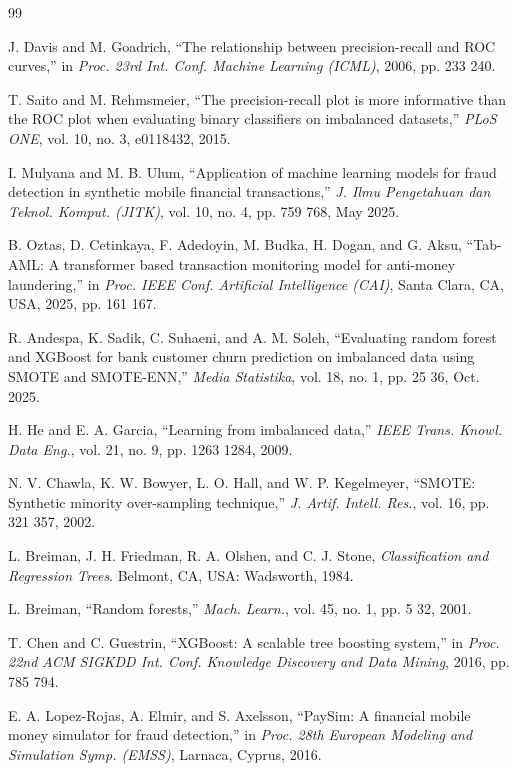 \documentclass[10pt,twocolumn,a4paper]{article}
\begin{document}
\begin{thebibliography}{99}
\setlength{\itemsep}{1pt}

 J. Davis and M. Goadrich, ``The relationship between precision-recall and ROC curves,'' in \emph{Proc. 23rd Int. Conf. Machine Learning (ICML)}, 2006, pp. 233 240.

 T. Saito and M. Rehmsmeier, ``The precision-recall plot is more informative than the ROC plot when evaluating binary classifiers on imbalanced datasets,'' \emph{PLoS ONE}, vol. 10, no. 3, e0118432, 2015.

 I. Mulyana and M. B. Ulum, ``Application of machine learning models for fraud detection in synthetic mobile financial transactions,'' \emph{J. Ilmu Pengetahuan dan Teknol. Komput. (JITK)}, vol. 10, no. 4, pp. 759 768, May 2025.

 B. Oztas, D. Cetinkaya, F. Adedoyin, M. Budka, H. Dogan, and G. Aksu, ``Tab-AML: A transformer based transaction monitoring model for anti-money laundering,'' in \emph{Proc. IEEE Conf. Artificial Intelligence (CAI)}, Santa Clara, CA, USA, 2025, pp. 161 167.

 R. Andespa, K. Sadik, C. Suhaeni, and A. M. Soleh, ``Evaluating random forest and XGBoost for bank customer churn prediction on imbalanced data using SMOTE and SMOTE-ENN,'' \emph{Media Statistika}, vol. 18, no. 1, pp. 25 36, Oct. 2025.

 H. He and E. A. Garcia, ``Learning from imbalanced data,'' \emph{IEEE Trans. Knowl. Data Eng.}, vol. 21, no. 9, pp. 1263 1284, 2009.

 N. V. Chawla, K. W. Bowyer, L. O. Hall, and W. P. Kegelmeyer, ``SMOTE: Synthetic minority over-sampling technique,'' \emph{J. Artif. Intell. Res.}, vol. 16, pp. 321 357, 2002.

 L. Breiman, J. H. Friedman, R. A. Olshen, and C. J. Stone, \emph{Classification and Regression Trees}. Belmont, CA, USA: Wadsworth, 1984.

 L. Breiman, ``Random forests,'' \emph{Mach. Learn.}, vol. 45, no. 1, pp. 5 32, 2001.

 T. Chen and C. Guestrin, ``XGBoost: A scalable tree boosting system,'' in \emph{Proc. 22nd ACM SIGKDD Int. Conf. Knowledge Discovery and Data Mining}, 2016, pp. 785 794.

 E. A. Lopez-Rojas, A. Elmir, and S. Axelsson, ``PaySim: A financial mobile money simulator for fraud detection,'' in \emph{Proc. 28th European Modeling and Simulation Symp. (EMSS)}, Larnaca, Cyprus, 2016.


\end{thebibliography}
\end{document}
